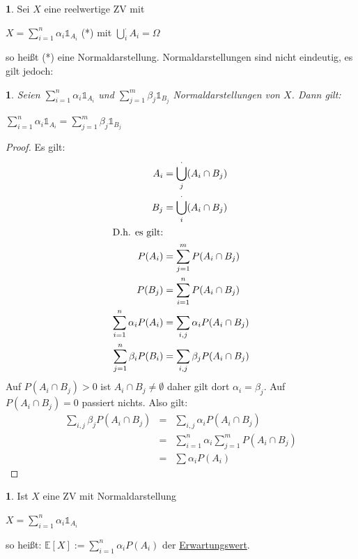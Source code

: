 \documentclass[10pt,a4paper]{report}
\numberwithin{equation}{section}
\numberwithin{figure}{section}
\theoremstyle{plain}
\theoremstyle{definition}
\newtheorem{defn}[thm]{\protect\definitionname}
\theoremstyle{remark}
\theoremstyle{plain}
\newtheorem{lem}[thm]{\protect\lemmaname}
\providecommand{\definitionname}{Definition}
\providecommand{\lemmaname}{Lemma}
\newcommand{\1}{ \mathbb{1} } %
\begin{document}
\begin{defn} 
  Sei $X$ eine reelwertige ZV mit
  \begin{center}
    $X=\sum\limits_{i=1}^n\alpha_i\1_{A_i}$ (*) mit $\bigcup_i^\cdot
    A_i=\Omega$
  \end{center}
  so heißt (*) eine Normaldarstellung. Normaldarstellungen sind nicht eindeutig, es gilt jedoch:
\end{defn}
\begin{lem}
  Seien $\sum\limits_{i=1}^n \alpha_i \1_{A_i}$ und
  $\sum\limits_{j=1}^m\beta_j\1_{B_j}$ Normaldarstellungen von
  $X$. Dann gilt:
  \begin{center}
    $\sum\limits_{i=1}^n \alpha_i
    \1_{A_i}=\sum\limits_{j=1}^m\beta_j\1_{B_j}$
  \end{center}
\end{lem}
\begin{proof}
Es gilt: 
  \begin{align*}
    A_i&=\bigcup_j^\cdot (A_i\cap B_j)\\
    B_j&=\bigcup_i^\cdot (A_i\cap B_j)\\
    \intertext{D.h. es gilt: } 
    P(A_i)&=\sum\limits_{j=1}^mP(A_i\cap B_j)\\
    P(B_j)&=\sum\limits_{i=1}^nP(A_i\cap B_j)\\
    \sum\limits_{i=1}^n\alpha_iP(A_i)&=\sum\limits_{i,j}\alpha_iP(A_i\cap B_j)\\
    \sum\limits_{j=1}^n\beta_iP(B_i)&=\sum\limits_{i,j}\beta_jP(A_i\cap B_j)
  \end{align*}
  Auf $P(A_i\cap B_j)>0$ ist $A_i\cap B_j \neq \emptyset$ daher gilt
  dort $\alpha_i=\beta_j$. Auf $P(A_i\cap B_j)=0$ passiert
  nichts. Also gilt:
  \begin{eqnarray*}
    \sum\limits_{i,j}\beta_jP(A_i\cap B_j)&=&\sum\limits_{i,j}\alpha_iP(A_i\cap B_j)\\
    &=&\sum\limits_{i=1}^n\alpha_i\sum\limits_{j=1}^mP(A_i\cap B_j)\\
    &=&\sum\limits \alpha_i P(A_i)
  \end{eqnarray*}
\end{proof}
\begin{defn}  
  Ist $X$ eine ZV mit Normaldarstellung
  \begin{center}
    $X=\sum\limits_{i=1}^n\alpha_i\1_{A_i}$
  \end{center}
  so heißt: $\mathbb{E}[X]:=\sum\limits_{i=1}^n\alpha_iP(A_i)$ der \underline{Erwartungswert}.
\end{defn}
\end{document}
